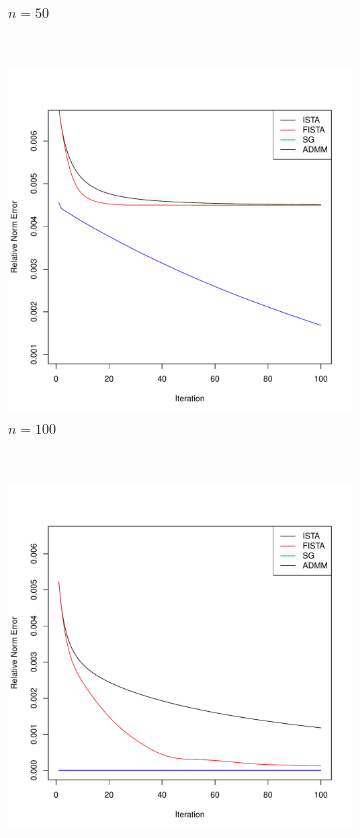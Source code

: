 \documentclass[12pt, leqno]{article}
\theoremstyle{remark}
\begin{document}
\begin{figure}[H]
\begin{subfigure}[b]{0.4\textwidth}
        \caption{$n=50$}
        \label{fig:50}
    \end{subfigure}
\\
    \begin{subfigure}[b]{0.4\textwidth}
        \includegraphics[width=\textwidth]{100cvgc2-cn.pdf}
        \caption{$n=100$}
        \label{fig:100}
    \end{subfigure}
~
    \begin{subfigure}[b]{0.4\textwidth}
        \includegraphics[width=\textwidth]{500cvgc2-cn.pdf}

\end{subfigure}
\end{figure}
\end{document}
